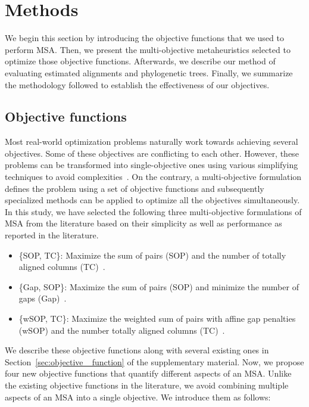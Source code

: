 \section{Methods}
\label{sec:methods}
We begin this section by introducing the objective functions that we used to perform MSA. Then, we present the multi-objective metaheuristics selected to optimize those objective functions. Afterwards, we describe our method of evaluating estimated alignments and phylogenetic trees. Finally, we summarize the methodology followed to establish the effectiveness of our objectives. 


\subsection{Objective functions}
\label{sec:formulation}
Most real-world optimization problems naturally work towards achieving several objectives. Some of these objectives are conflicting to each other. However, these problems can be transformed into single-objective ones using various simplifying techniques to avoid complexities~\citep{kalyanmoy2001multi}. On the contrary, a multi-objective formulation defines the problem using a set of objective functions and subsequently specialized methods can be applied to optimize all the objectives simultaneously. In this study, we have selected the following three multi-objective formulations of MSA from the literature based on their simplicity as well as performance as reported in the literature.
\begin{itemize}
	\item \{SOP, TC\}: Maximize the sum of pairs (SOP) and the number of totally aligned columns (TC)~\citep{da2010alineaga}.
	
	\item \{Gap, SOP\}: Maximize the sum of pairs (SOP) and minimize the number of gaps (Gap)~\citep{abbasi2015local}.
	
	\item \{wSOP, TC\}: Maximize the weighted sum of pairs with affine gap penalties (wSOP) and the number totally aligned columns (TC)~\citep{rubio2016bee, rubio2016hybrid}.
\end{itemize}
 
We describe these objective functions along with several existing ones in Section~\ref{sec:objective _function} of the supplementary material. Now, we propose four new objective functions that quantify different aspects of an MSA. Unlike the existing objective functions in the literature, we avoid combining multiple aspects of an MSA into a single objective. We introduce them as follows: 

